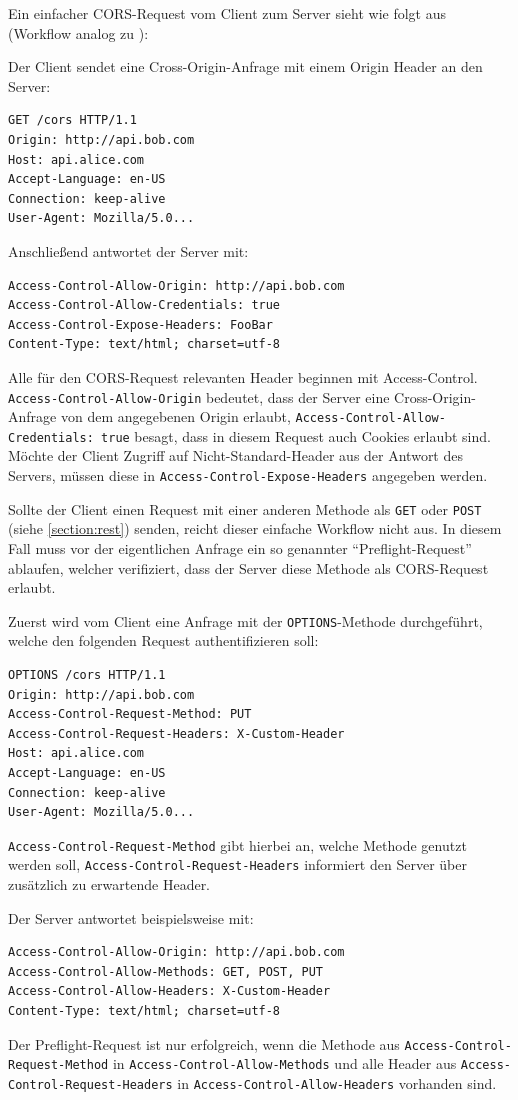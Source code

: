 Ein einfacher CORS-Request vom Client zum Server sieht wie folgt aus (Workflow analog zu \cite{Hossain2012}):

Der Client sendet eine Cross-Origin-Anfrage mit einem Origin Header an den Server:
\begin{lstlisting}
GET /cors HTTP/1.1
Origin: http://api.bob.com
Host: api.alice.com
Accept-Language: en-US
Connection: keep-alive
User-Agent: Mozilla/5.0...
\end{lstlisting}
 
Anschließend antwortet der Server mit:
\begin{lstlisting}
Access-Control-Allow-Origin: http://api.bob.com
Access-Control-Allow-Credentials: true
Access-Control-Expose-Headers: FooBar
Content-Type: text/html; charset=utf-8
\end{lstlisting}
Alle für den CORS-Request relevanten Header beginnen mit Access-Control. \\ \texttt{Access-Control-Allow-Origin} bedeutet, dass der Server eine Cross-Origin-Anfrage von dem angegebenen Origin erlaubt, \texttt{Access-Control-Allow-Credentials: true} besagt, dass in diesem Request auch Cookies erlaubt sind. Möchte der Client Zugriff auf Nicht-Standard-Header aus der Antwort des Servers, müssen diese in \texttt{Access-Control-Expose-Headers} angegeben werden.

Sollte der Client einen Request mit einer anderen Methode als \texttt{GET} oder \texttt{POST} (siehe \ref{section:rest}) senden, reicht dieser einfache Workflow nicht aus. In diesem Fall muss vor der eigentlichen Anfrage ein so genannter "`Preflight-Request"' ablaufen, welcher verifiziert, dass der Server diese Methode als CORS-Request erlaubt.

Zuerst wird vom Client eine Anfrage mit der \texttt{OPTIONS}-Methode durchgeführt, welche den folgenden Request authentifizieren soll:
\begin{lstlisting}
OPTIONS /cors HTTP/1.1
Origin: http://api.bob.com
Access-Control-Request-Method: PUT
Access-Control-Request-Headers: X-Custom-Header
Host: api.alice.com
Accept-Language: en-US
Connection: keep-alive
User-Agent: Mozilla/5.0...
\end{lstlisting}
\texttt{Access-Control-Request-Method} gibt hierbei an, welche Methode genutzt werden soll, \texttt{Access-Control-Request-Headers} informiert den Server über zusätzlich zu erwartende Header. 

Der Server antwortet beispielsweise mit:
\begin{lstlisting}
Access-Control-Allow-Origin: http://api.bob.com
Access-Control-Allow-Methods: GET, POST, PUT
Access-Control-Allow-Headers: X-Custom-Header
Content-Type: text/html; charset=utf-8
\end{lstlisting}
Der Preflight-Request ist nur erfolgreich, wenn die Methode aus \texttt{Access-Control-Request-Method} in \texttt{Access-Control-Allow-Methods} und alle Header aus \texttt{Access-Control-Request-Headers} in \texttt{Access-Control-Allow-Headers} vorhanden sind.

